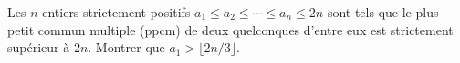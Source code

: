 Les $n$ entiers strictement positifs $a_1 \leq a_2 \leq \cdots \leq a_n \leq 2n$ sont tels que le plus petit commun multiple (ppcm) de deux quelconques d'entre eux est strictement supérieur à $2n$. Montrer que $a_1 > \lfloor 2n/3 \rfloor$.
